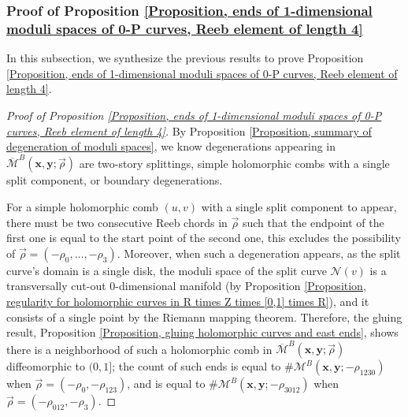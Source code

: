 \documentclass{amsart}
\theoremstyle{definition}
\theoremstyle{remark}
\numberwithin{equation}{section}
\numberwithin{equation}{section} \makeatletter
\begin{document}
\subsubsection{Proof of Proposition \ref{Proposition, ends of 1-dimensional moduli spaces of 0-P curves, Reeb element of length 4}}
In this subsection, we synthesize the previous results to prove Proposition \ref{Proposition, ends of 1-dimensional moduli spaces of 0-P curves, Reeb element of length 4}.
\begin{proof}[Proof of Proposition \ref{Proposition, ends of 1-dimensional moduli spaces of 0-P curves, Reeb element of length 4}]
By Proposition \ref{Proposition, summary of degeneration of moduli spaces}, we know degenerations appearing in $\overline{\mathcal{M}}^B(\bm{x},\bm{y};\overrightarrow{\rho})$ are two-story splittings, simple holomorphic combs with a single split component, or boundary degenerations. 

For a simple holomorphic comb $(u,v)$ with a single split component to appear, there must be two consecutive Reeb chords in $\overrightarrow{\rho}$ such that the endpoint of the first one is equal to the start point of the second one, this excludes the possibility of $\overrightarrow{\rho}=(-\rho_0,\ldots,-\rho_3)$. Moreover, when such a degeneration appears, as the split curve's domain is a single disk, the moduli space of the split curve $\mathcal{N}(v)$ is a transversally cut-out 0-dimensional manifold (by Proposition \ref{Proposition, regularity for holomorphic curves in R times Z times [0,1] times R}), and it consists of a single point by the Riemann mapping theorem. Therefore, the gluing result, Proposition \ref{Proposition, gluing holomorphic curves and east ends}, shows there is a neighborhood of such a holomorphic comb in $\overline{\mathcal{M}}^B(\bm{x},\bm{y};\overrightarrow{\rho})$ diffeomorphic to $(0,1]$; the count of such ends is equal to $\#\mathcal{M}^B(\bm{x},\bm{y};-\rho_{1230})$ when $\overrightarrow{\rho}=(-\rho_0,-\rho_{123})$, and is equal to $\#\mathcal{M}^B(\bm{x},\bm{y};-\rho_{3012})$ when $\overrightarrow{\rho}=(-\rho_{012},-\rho_{3})$.


\end{proof}
\end{document}
